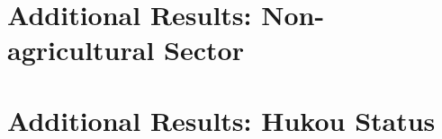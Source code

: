\documentclass[12pt]{article}
\begin{document}
\section{Additional Results: Non-agricultural Sector}\label{app:nonag}

\begin{landscape}
     
\end{landscape}



%      
% 
% 
% 
% 




\newpage
\section{Additional Results: Hukou Status}\label{app:temp}






% 
% 
% 
% 
% 
% 
\end{document}
